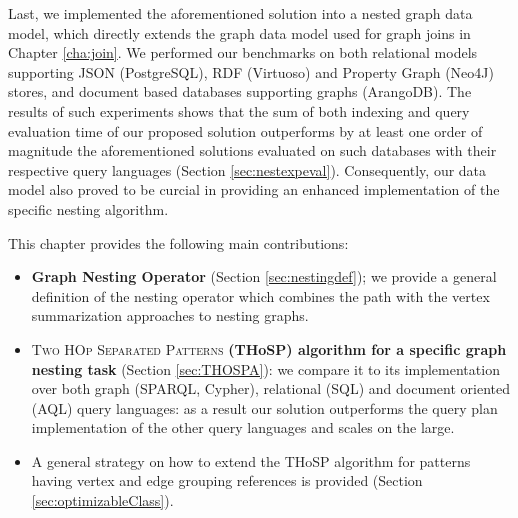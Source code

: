Last, we implemented the aforementioned solution into a nested graph data model, which directly extends the graph data model used for graph joins in Chapter \vref{cha:join}. We performed our benchmarks on both relational models supporting JSON (PostgreSQL), RDF (Virtuoso) and Property Graph (Neo4J) stores, and document based databases supporting graphs (ArangoDB). The results of such experiments shows that the sum of both indexing and query evaluation time of our proposed solution outperforms by at least one order of magnitude the aforementioned solutions evaluated on such databases with their respective query languages (Section \ref{sec:nestexpeval}). Consequently, our data model also proved to be curcial in providing an enhanced implementation of the specific nesting algorithm. 

This chapter provides the following main contributions:

\begin{itemize}
	\item \textbf{Graph Nesting Operator} (Section \ref{sec:nestingdef}); we provide a general definition of the nesting operator which combines the path  with the vertex summarization approaches to nesting graphs.
	\item \textsc{{Two HOp Separated Patterns}} \textbf{(THoSP) algorithm for a specific graph nesting task} (Section \ref{sec:THOSPA}): we
	compare it to its implementation
	over both graph  (SPARQL, Cypher), relational (SQL) and document oriented (AQL) query languages: as a result our solution outperforms
	the query plan implementation of the other query languages and scales on the large.
	\item A general strategy on how to extend the THoSP algorithm for patterns having vertex and edge grouping references is provided (Section \ref{sec:optimizableClass}).
\end{itemize}



